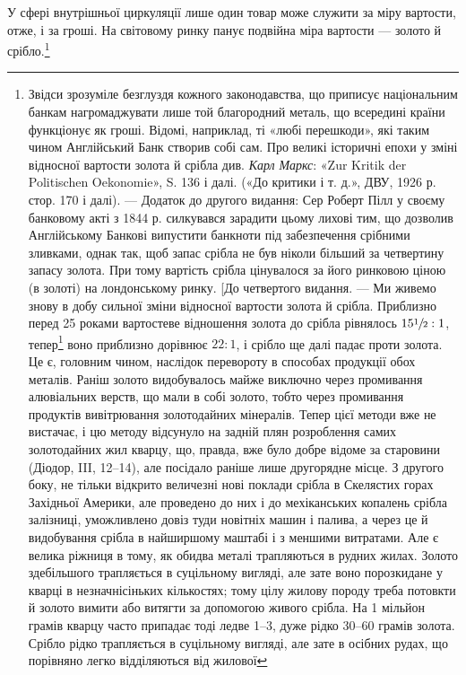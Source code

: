 У сфері внутрішньої циркуляції лише один товар може служити
за міру вартости, отже, і за гроші. На світовому ринку
панує подвійна міра вартости — золото й срібло.\footnote{
Звідси зрозуміле безглуздя кожного законодавства, що приписує
національним банкам нагромаджувати лише той благородний металь,
що всередині країни функціонує як гроші. Відомі, наприклад, ті «любі
перешкоди», які таким чином Англійський Банк створив собі сам. Про
великі історичні епохи у зміні відносної вартости золота й срібла див.
\emph{Карл Маркс}: «Zur Kritik der Politischen Oekonomie», S. 136 і далі. («До
критики і т. д.», ДВУ, 1926 р. стор. 170 і далі). — Додаток до другого видання:
Сер Роберт Пілл у своєму банковому акті з 1844 р. силкувався зарадити
цьому лихові тим, що дозволив Англійському Банкові випустити банкноти
під забезпечення срібними зливками, однак так, щоб запас срібла
не був ніколи більший за четвертину запасу золота. При тому вартість
срібла цінувалося за його ринковою ціною (в золоті) на лондонському
ринку. [До четвертого видання. — Ми живемо знову в добу сильної зміни
відносної вартости золота й срібла. Приблизно перед 25 роками вартостеве
відношення золота до срібла рівнялось $15\sfrac{1}{2} : 1$, тепер\footnote*{
1890 р. — рік виготовлення 4 видання. \emph{Ред.}
} воно приблизно
дорівнює $22 : 1$, і срібло ще далі падає проти золота. Це є, головним чином,
наслідок перевороту в способах продукції обох металів. Раніш золото
видобувалось майже виключно через промивання алювіальних
верств, що мали в собі золото, тобто через промивання продуктів вивітрювання
золотодайних мінералів. Тепер цієї методи вже не вистачає,
і цю методу відсунуло на задній плян розроблення самих золотодайних
жил кварцу, що, правда, вже було добре відоме за старовини (Діодор, III,
12--14), але посідало раніше лише другорядне місце. З другого боку, не
тільки відкрито величезні нові поклади срібла в Скелястих горах Західньої
Америки, але проведено до них і до мехіканських копалень срібла
залізниці, уможливлено довіз туди новітніх машин і палива, а через це
й видобування срібла в найширшому маштабі і з меншими витратами.
Але є велика ріжниця в тому, як обидва металі трапляються в рудних
жилах. Золото здебільшого трапляється в суцільному вигляді, але зате воно
порозкидане у кварці в незначнісіньких кількостях; тому цілу жилову
породу треба потовкти й золото вимити або витягти за допомогою живого
срібла. На 1 мільйон грамів кварцу часто припадає тоді ледве 1--3,
дуже рідко 30--60 грамів золота. Срібло рідко трапляється в суцільному
вигляді, але зате в осібних рудах, що порівняно легко відділяються від жилової
}
